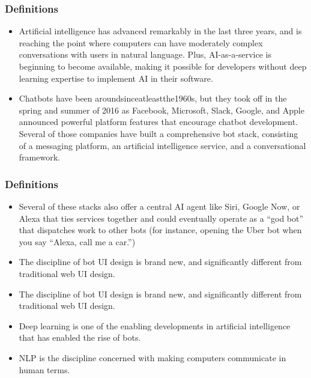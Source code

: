 \documentclass[11pt]{beamer}
\begin{document}
\begin{frame}
\frametitle{Definitions}
\begin{itemize}
	\item Artificial intelligence has advanced remarkably in the last three years, and is reaching the point where computers can have moderately complex conversations with users in natural language. Plus, AI-as-a-service is beginning to become available, making it possible for developers without deep learning expertise to implement AI in their software.
	\item Chatbots have been aroundsinceatleastthe1960s, but they took off in the spring and summer of 2016 as Facebook, Microsoft, Slack, Google, and Apple announced powerful platform features that encourage chatbot development. Several of those companies have built a comprehensive bot stack, consisting of a messaging platform, an artificial intelligence service, and a conversational framework.
\end{itemize}
\end{frame}

\begin{frame}
\frametitle{Definitions}
\begin{itemize}
	\item Several of these stacks also offer a central AI agent like Siri, Google Now, or Alexa that ties services together and could eventually operate as a “god bot” that dispatches work to other bots (for instance, opening the Uber bot when you say “Alexa, call me a car.”)
	\item The discipline of bot UI design is brand new, and significantly different from traditional web UI design.
	\item The discipline of bot UI design is brand new, and significantly different from traditional web UI design.
	\item Deep learning is one of the enabling developments in artificial intelligence that has enabled the rise of bots. 
	\item NLP is the discipline concerned with making computers communicate in human terms.
\end{itemize}
\end{frame}
\end{document}
